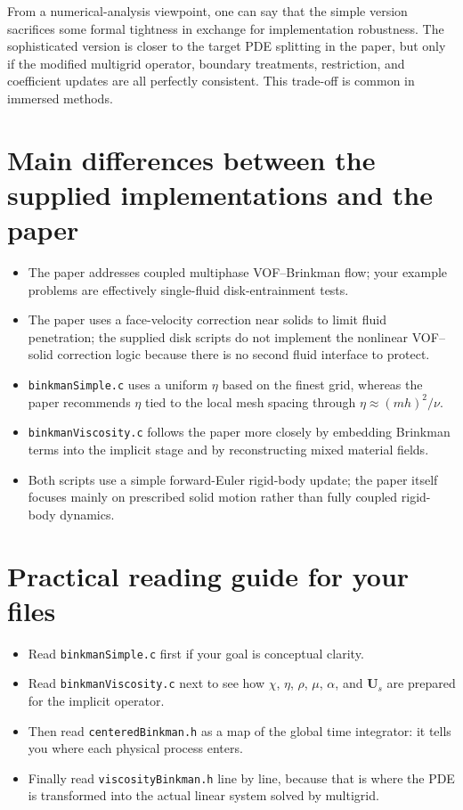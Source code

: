 \documentclass[11pt,a4paper]{article}
\begin{document}
From a numerical-analysis viewpoint, one can say that the simple version sacrifices some formal tightness in exchange for implementation robustness. The sophisticated version is closer to the target PDE splitting in the paper, but only if the modified multigrid operator, boundary treatments, restriction, and coefficient updates are all perfectly consistent. This trade-off is common in immersed methods.

\section{Main differences between the supplied implementations and the paper}

\begin{itemize}[leftmargin=1.8em]
\item The paper addresses coupled multiphase VOF--Brinkman flow; your example problems are effectively single-fluid disk-entrainment tests.
\item The paper uses a face-velocity correction near solids to limit fluid penetration; the supplied disk scripts do not implement the nonlinear VOF--solid correction logic because there is no second fluid interface to protect.
\item \texttt{binkmanSimple.c} uses a uniform $\eta$ based on the finest grid, whereas the paper recommends $\eta$ tied to the local mesh spacing through $\eta\approx (mh)^2/\nu$.
\item \texttt{binkmanViscosity.c} follows the paper more closely by embedding Brinkman terms into the implicit stage and by reconstructing mixed material fields.
\item Both scripts use a simple forward-Euler rigid-body update; the paper itself focuses mainly on prescribed solid motion rather than fully coupled rigid-body dynamics.
\end{itemize}

\section{Practical reading guide for your files}

\begin{itemize}[leftmargin=1.8em]
\item Read \texttt{binkmanSimple.c} first if your goal is conceptual clarity.
\item Read \texttt{binkmanViscosity.c} next to see how $\chi$, $\eta$, $\rho$, $\mu$, $\alpha$, and $\bm{U}_s$ are prepared for the implicit operator.
\item Then read \texttt{centeredBinkman.h} as a map of the global time integrator: it tells you where each physical process enters.
\item Finally read \texttt{viscosityBinkman.h} line by line, because that is where the PDE is transformed into the actual linear system solved by multigrid.
\end{itemize}
\end{document}
